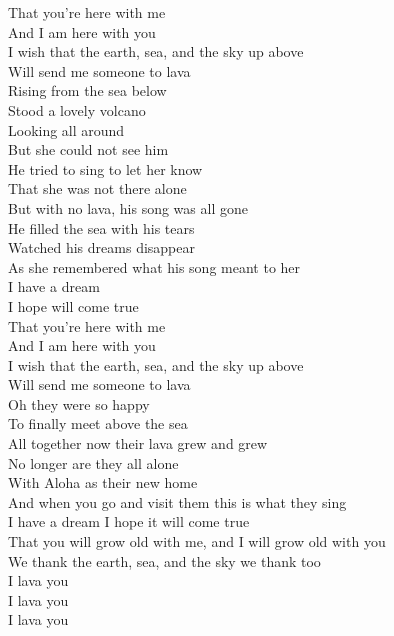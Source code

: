 \begin{flushleft}
\hspace{0.9cm}That you're here with me\\
\hspace{0.9cm}And I am here with you\\
\hspace{0.9cm}I wish that the earth, sea, and the sky up above\\
\hspace{0.9cm}Will send me someone to lava\\
\hops
Rising from the sea below\\
Stood a lovely volcano\\
Looking all around\\
But she could not see him\\
He tried to sing to let her know\\
That she was not there alone\\
But with no lava, his song was all gone\\
He filled the sea with his tears\\
Watched his dreams disappear\\
As she remembered what his song meant to her\\
\hops
\hspace{0.9cm}I have a dream\\
\hspace{0.9cm}I hope will come true\\
\hspace{0.9cm}That you're here with me\\
\hspace{0.9cm}And I am here with you\\
\hspace{0.9cm}I wish that the earth, sea, and the sky up above\\
\hspace{0.9cm}Will send me someone to lava\\
\hops
Oh they were so happy\\
To finally meet above the sea\\
All together now their lava grew and grew\\
No longer are they all alone\\
With Aloha as their new home\\
And when you go and visit them this is what they sing\\
\hops
\hspace{0.9cm}I have a dream I hope it will come true\\
\hspace{0.9cm}That you will grow old with me, and I will grow old with you\\
\hspace{0.9cm}We thank the earth, sea, and the sky we thank too\\
\hspace{0.9cm}I lava you\\
\hspace{0.9cm}I lava you\\
\hspace{0.9cm}I lava you\\

\end{flushleft}
\newpage